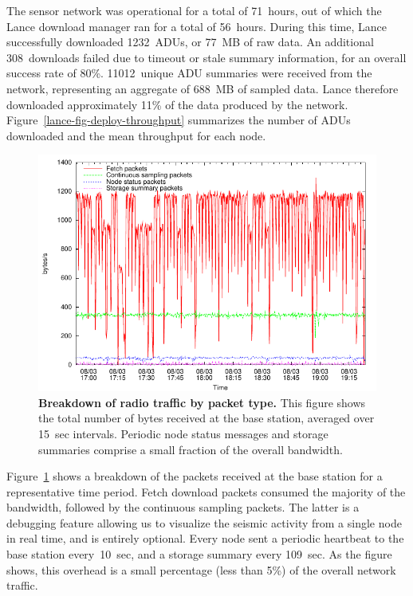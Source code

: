The sensor network was operational for a total of 71~hours, out of
which the Lance download manager ran for a total of 56~hours. 
During this time, Lance successfully downloaded 1232~ADUs, or 77~MB of 
raw data. An additional 308~downloads failed due to timeout or stale summary 
information, for an overall success rate of 80\%. 
11012~unique ADU summaries were received from the network,
representing an aggregate of 688~MB of sampled data. Lance therefore
downloaded approximately 11\% of the data produced by the network.
Figure~\ref{lance-fig-deploy-throughput} summarizes the number of ADUs
downloaded and the mean throughput for each node. 


\begin{figure}[t]
\label{lance-fig-packetgraph}
\begin{center}
\includegraphics[width=0.9\hsize]{./6-lance/figs/deploy/packetgraph/packetgraph.pdf}
\end{center}
\caption{\textbf{Breakdown of radio traffic by packet type.}
This figure shows the total number of bytes received at the base station,
averaged over 15~sec intervals. Periodic node status messages and storage
summaries comprise a small fraction of the overall bandwidth.}
\end{figure}

Figure~\ref{lance-fig-packetgraph} shows a breakdown of the packets received
at the base station for a representative time period.
Fetch download packets consumed the majority of
the bandwidth, followed by the continuous sampling packets.
The latter is a debugging feature allowing us to visualize the
seismic activity from a single node in real time, and is entirely optional.
Every node sent a periodic heartbeat to the base station every~10~sec,
and a storage summary every 109~sec. As the figure shows, this
overhead is a small percentage (less than 5\%) of the overall network
traffic. 

